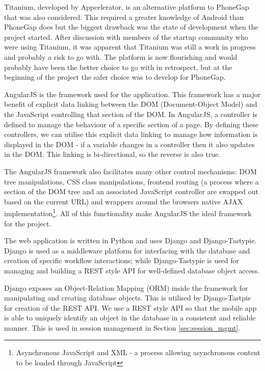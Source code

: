 Titanium, developed by Appcelerator\cite{titanium}, is an alternative
platform to PhoneGap that was also considered. This required a greater
knowledge of Android than PhoneGap does but the biggest drawback was
the state of development when the project started. After discussion
with members of the startup community who were using Titanium, it was
apparent that Titanium was still a work in progress and probably a
risk to go with. The platform is now flourishing and would probably
have been the better choice to go with in retrospect, but at the
beginning of the project the safer choice was to develop for PhoneGap.

AngularJS\cite{angularjs} is the framework used for the
application. This framework has a major benefit of explicit data linking
between the DOM (Document-Object Model) and the JavaScript controlling
that section of the DOM. In AngularJS, a controller is defined to
manage the behaviour of a specific section of a page. By defining
these controllers, we can utilise this explicit data linking to manage
how information is displayed in the DOM - if a variable changes in a
controller then it also updates in the DOM. This linking is
bi-directional, so the reverse is also true. 

The AngularJS framework also facilitates many other control
mechanisms: DOM tree manipulations, CSS class manipulations, frontend
routing (a process where a section of the DOM tree and an associated
JavaScript controller are swapped out based on the current URL) and
wrappers around the browsers native AJAX implementation\footnote{Asynchronous
JavaScript and XML - a process allowing asynchronous content to be
loaded through JavaScript}. All of this
functionality make AngularJS the ideal framework for the project. 

The web application is written in Python and uses Django\cite{django}
and Django-Tastypie\cite{tastypie}. Django is used as a middleware
platform for interfacing with the database and creation of specific
workflow interactions; while Django-Tastypie is used for managing and
building a REST style API for well-defined database object access.

Django exposes an Object-Relation Mapping (ORM) inside the framework
for manipulating and creating database objects. This is utilised by
Django-Tastpie for creation of the REST API. We use a REST style API
so that the mobile app is able to uniquely identify an object in the
database in a consistent and reliable manner. This is used in 
session management in Section \ref{sec:session_mgmt}.

